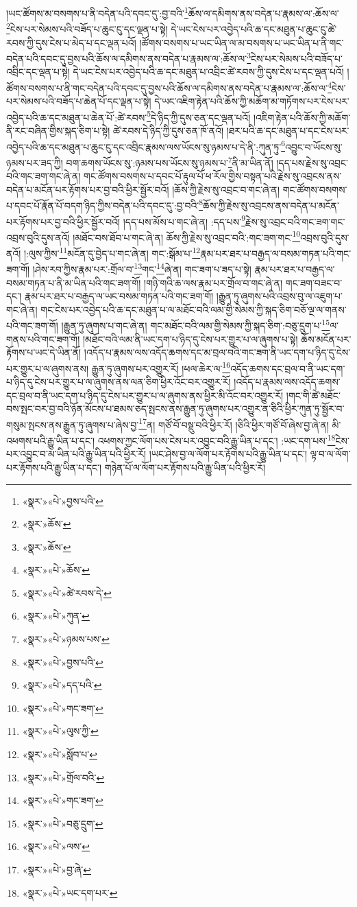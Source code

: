 །ཡང་ཚོགས་མ་བསགས་པ་ནི་བདེན་པའི་དབང་དུ་:བྱ་བའི་\footnote{«སྣར་»«པེ་»བྱས་པའི་}ཆོས་ལ་དམིགས་ནས་བདེན་པ་རྣམས་ལ་:ཆོས་ལ་\footnote{«སྣར་»ཆོས་}ངེས་པར་སེམས་པའི་བཟོད་པ་ཆུང་ངུ་དང་ལྡན་པ་སྟེ། དེ་ཡང་ངེས་པར་འབྱེད་པའི་ཆ་དང་མཐུན་པ་ཆུང་ངུ་ཚེ་རབས་ཀྱི་དུས་ངེས་པ་མེད་པ་དང་ལྡན་པའོ། །ཚོགས་བསགས་པ་ཡང་ཡིན་ལ་མ་བསགས་པ་ཡང་ཡིན་པ་ནི་གང་བདེན་པའི་དབང་དུ་བྱས་པའི་ཆོས་ལ་དམིགས་ནས་བདེན་པ་རྣམས་ལ་:ཆོས་ལ་\footnote{«སྣར་»ཆོས་}ངེས་པར་སེམས་པའི་བཟོད་པ་འབྲིང་དང་ལྡན་པ་སྟེ། དེ་ཡང་ངེས་པར་འབྱེད་པའི་ཆ་དང་མཐུན་པ་འབྲིང་ཚེ་རབས་ཀྱི་དུས་ངེས་པ་དང་ལྡན་པའོ། །ཚོགས་བསགས་པ་ནི་གང་བདེན་པའི་དབང་དུ་བྱས་པའི་ཆོས་ལ་དམིགས་ནས་བདེན་པ་རྣམས་ལ་:ཆོས་ལ་\footnote{«སྣར་»«པེ་»ཆོས་}ངེས་པར་སེམས་པའི་བཟོད་པ་ཆེན་པོ་དང་ལྡན་པ་སྟེ། དེ་ཡང་འཇིག་རྟེན་པའི་ཆོས་ཀྱི་མཆོག་མ་གཏོགས་པར་ངེས་པར་འབྱེད་པའི་ཆ་དང་མཐུན་པ་ཆེན་པོ་:ཚེ་རབས་\footnote{«སྣར་»«པེ་»ཚེ་རབས་དེ་}དེ་ཉིད་ཀྱི་དུས་ཅན་དང་ལྡན་པའོ། །འཇིག་རྟེན་པའི་ཆོས་ཀྱི་མཆོག་ནི་རང་བཞིན་གྱིས་སྐད་ཅིག་པ་སྟེ། ཚེ་རབས་དེ་ཉིད་ཀྱི་དུས་ཅན་ཁོ་ནའོ། །ཐར་པའི་ཆ་དང་མཐུན་པ་དང་ངེས་པར་འབྱེད་པའི་ཆ་དང་མཐུན་པ་ཆུང་ངུ་དང་འབྲིང་རྣམས་ལས་ཡོངས་སུ་ཉམས་པ་དེ་ནི་:ཀུན་ཏུ་\footnote{«སྣར་»«པེ་»ཀུན་}འབྱུང་བ་ཡོངས་སུ་ཉམས་པར་ཟད་ཀྱི། བག་ཆགས་ཡོངས་སུ་:ཉམས་པས་ཡོངས་སུ་ཉམས་པ་\footnote{«སྣར་»«པེ་»ཉམས་པས་}ནི་མ་ཡིན་ནོ། །དད་པས་རྗེས་སུ་འབྲང་བའི་གང་ཟག་གང་ཞེ་ན། གང་ཚོགས་བསགས་པ་དབང་པོ་རྟུལ་པོ་ཕ་རོལ་གྱིས་བསྟན་པའི་རྗེས་སུ་འབྲངས་ནས་བདེན་པ་མངོན་པར་རྟོགས་པར་བྱ་བའི་ཕྱིར་སྦྱོར་བའོ། །ཆོས་ཀྱི་རྗེས་སུ་འབྲང་བ་གང་ཞེ་ན། གང་ཚོགས་བསགས་པ་དབང་པོ་རྣོན་པོ་བདག་ཉིད་ཀྱིས་བདེན་པའི་དབང་དུ་:བྱ་བའི་\footnote{«སྣར་»«པེ་»བྱས་པའི་}ཆོས་ཀྱི་རྗེས་སུ་འབྲངས་ནས་བདེན་པ་མངོན་པར་རྟོགས་པར་བྱ་བའི་ཕྱིར་སྦྱོར་བའོ། །དད་པས་མོས་པ་གང་ཞེ་ན། :དད་པས་\footnote{«སྣར་»«པེ་»དད་པའི་}རྗེས་སུ་འབྲང་བའི་གང་ཟག་གང་འབྲས་བུའི་དུས་ནའོ། །མཐོང་བས་ཐོབ་པ་གང་ཞེ་ན། ཆོས་ཀྱི་རྗེས་སུ་འབྲང་བའི་:གང་ཟག་གང་\footnote{«སྣར་»«པེ་»གང་ཟག་}འབྲས་བུའི་དུས་ནའོ། །:ལུས་ཀྱིས་\footnote{«སྣར་»«པེ་»ལུས་ཀྱི་}མངོན་དུ་བྱེད་པ་གང་ཞེ་ན། གང་:སྒོམ་པ་\footnote{«སྣར་»«པེ་»སློབ་པ་}རྣམ་པར་ཐར་པ་བརྒྱད་ལ་བསམ་གཏན་པའི་གང་ཟག་གོ། །ཤེས་རབ་ཀྱིས་རྣམ་པར་:གྲོལ་བ་\footnote{«སྣར་»«པེ་»གྲོལ་བའི་}གང་\footnote{«སྣར་»«པེ་»གང་ཟག་}ཞེ་ན། གང་ཟག་པ་ཟད་པ་སྟེ། རྣམ་པར་ཐར་པ་བརྒྱད་ལ་བསམ་གཏན་པ་ནི་མ་ཡིན་པའི་གང་ཟག་གོ། །གཉི་གའི་ཆ་ལས་རྣམ་པར་གྲོལ་བ་གང་ཞེ་ན། གང་ཟག་བཟང་བ་དང་། རྣམ་པར་ཐར་པ་བརྒྱད་ལ་ཡང་བསམ་གཏན་པའི་གང་ཟག་གོ། །རྒྱུན་ཏུ་ཞུགས་པའི་འབྲས་བུ་ལ་འཇུག་པ་གང་ཞེ་ན། གང་ངེས་པར་འབྱེད་པའི་ཆ་དང་མཐུན་པ་ལ་མཐོང་བའི་ལམ་གྱི་སེམས་ཀྱི་སྐད་ཅིག་བཅོ་ལྔ་ལ་གནས་པའི་གང་ཟག་གོ། །རྒྱུན་ཏུ་ཞུགས་པ་གང་ཞེ་ན། གང་མཐོང་བའི་ལམ་གྱི་སེམས་ཀྱི་སྐད་ཅིག་:བཅུ་དྲུག་པ་\footnote{«སྣར་»«པེ་»བཅུ་དྲུག་}ལ་གནས་པའི་གང་ཟག་གོ། །མཐོང་བའི་ལམ་ནི་ཡང་དག་པ་ཉིད་དུ་ངེས་པར་གྱུར་པ་ལ་ཞུགས་པ་སྟེ། ཆོས་མངོན་པར་རྟོགས་པ་ཡང་དེ་ཡིན་ནོ། །འདོད་པ་རྣམས་ལས་འདོད་ཆགས་དང་མ་བྲལ་བའི་གང་ཟག་ནི་ཡང་དག་པ་ཉིད་དུ་ངེས་པར་གྱུར་པ་ལ་ཞུགས་ནས། རྒྱུན་ཏུ་ཞུགས་པར་འགྱུར་རོ། །ཕལ་ཆེར་ལ་\footnote{«སྣར་»«པེ་»ལས་}འདོད་ཆགས་དང་བྲལ་བ་ནི་ཡང་དག་པ་ཉིད་དུ་ངེས་པར་གྱུར་པ་ལ་ཞུགས་ནས་ལན་ཅིག་ཕྱིར་འོང་བར་འགྱུར་རོ། །འདོད་པ་རྣམས་ལས་འདོད་ཆགས་དང་བྲལ་བ་ནི་ཡང་དག་པ་ཉིད་དུ་ངེས་པར་གྱུར་པ་ལ་ཞུགས་ནས་ཕྱིར་མི་འོང་བར་འགྱུར་རོ། །གང་གི་ཚེ་མཐོང་བས་སྤང་བར་བྱ་བའི་ཉོན་མོངས་པ་ཐམས་ཅད་སྤངས་ནས་རྒྱུན་ཏུ་ཞུགས་པར་འགྱུར་ན་ཅིའི་ཕྱིར་ཀུན་ཏུ་སྦྱོར་བ་གསུམ་སྤངས་ནས་རྒྱུན་ཏུ་ཞུགས་པ་ཞེས་བྱ་\footnote{«སྣར་»«པེ་»བྱ་ཞེ་}ན། གཙོ་བོ་བསྡུ་བའི་ཕྱིར་རོ། །ཅིའི་ཕྱིར་གཙོ་བོ་ཞེས་བྱ་ཞེ་ན། མི་འཕགས་པའི་རྒྱུ་ཡིན་པ་དང་། འཕགས་ཀྱང་ལོག་པས་ངེས་པར་འབྱུང་བའི་རྒྱུ་ཡིན་པ་དང་། :ཡང་དག་པས་\footnote{«སྣར་»«པེ་»ཡང་དག་པར་}ངེས་པར་འབྱུང་བ་མ་ཡིན་པའི་རྒྱུ་ཡིན་པའི་ཕྱིར་རོ། །ཡང་ཤེས་བྱ་ལ་ལོག་པར་རྟོགས་པའི་རྒྱུ་ཡིན་པ་དང་། ལྟ་བ་ལ་ལོག་པར་རྟོགས་པའི་རྒྱུ་ཡིན་པ་དང་། གཉེན་པོ་ལ་ལོག་པར་རྟོགས་པའི་རྒྱུ་ཡིན་པའི་ཕྱིར་རོ། 